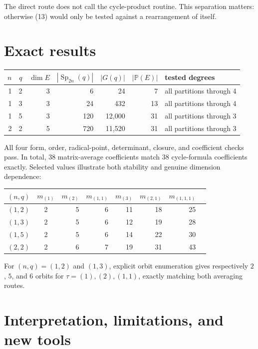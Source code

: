 \documentclass[11pt]{article}
\newcommand{\Sp}{\operatorname{Sp}}
\begin{document}
The direct route does not call the cycle-product routine. This separation
matters: otherwise (13) would only be tested against a rearrangement of itself.

\section{Exact results}

\begin{center}
\begin{tabularx}{\linewidth}{@{}rrrrrrX@{}}
\toprule
$n$ & $q$ & $\dim E$ & $|\Sp_{2n}(q)|$ & $|G(q)|$ & $|\mathbb P(E)|$ & tested degrees\\
\midrule
1&2&3&6&24&7&all partitions through 4\\
1&3&3&24&432&13&all partitions through 4\\
1&5&3&120&12,000&31&all partitions through 3\\
2&2&5&720&11,520&31&all partitions through 3\\
\bottomrule
\end{tabularx}
\end{center}
All four form, order, radical-point, determinant, closure, and coefficient
checks pass. In total, 38 matrix-average coefficients match 38 cycle-formula
coefficients exactly. Selected values illustrate both stability and genuine
dimension dependence:
\begin{center}
\begin{tabular}{@{}ccrrrrrr@{}}
\toprule
$(n,q)$ & $m_{(1)}$ & $m_{(2)}$ & $m_{(1,1)}$ & $m_{(3)}$ & $m_{(2,1)}$ & $m_{(1,1,1)}$\\
\midrule
$(1,2)$&2&5&6&11&18&25\\
$(1,3)$&2&5&6&12&19&28\\
$(1,5)$&2&5&6&14&22&30\\
$(2,2)$&2&6&7&19&31&43\\
\bottomrule
\end{tabular}
\end{center}
For $(n,q)=(1,2)$ and $(1,3)$, explicit orbit enumeration gives respectively
$2$, $5$, and $6$ orbits for $\tau=(1),(2),(1,1)$, exactly matching both
averaging routes.

\section{Interpretation, limitations, and new tools}
\end{document}
